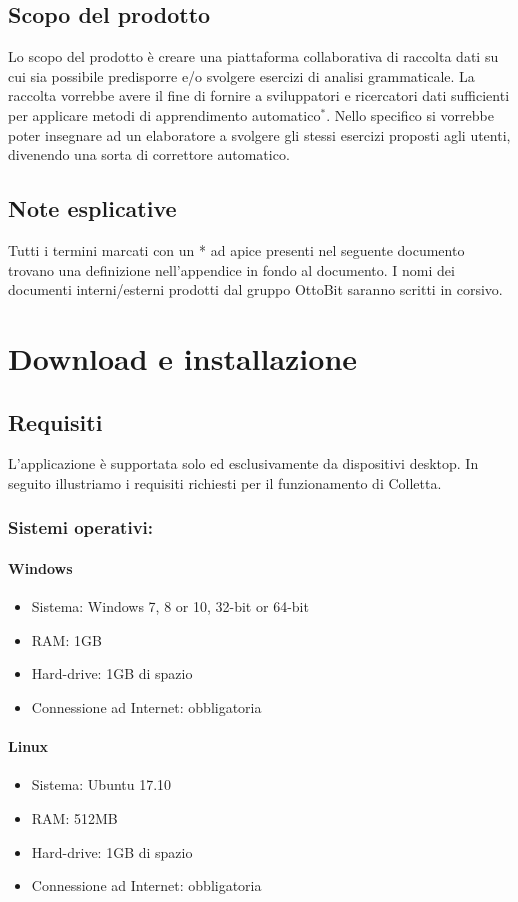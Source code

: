 \documentclass[11pt,a4paper]{article}
\begin{document}
{	\subsection{Scopo del prodotto}
	Lo scopo del prodotto è creare una piattaforma collaborativa di raccolta dati su cui sia possibile predisporre e/o svolgere esercizi di analisi grammaticale. La raccolta vorrebbe avere il fine di fornire a sviluppatori e ricercatori dati sufficienti per applicare metodi di apprendimento automatico$^*$. Nello specifico si vorrebbe poter insegnare ad un elaboratore a svolgere gli stessi esercizi proposti agli utenti, divenendo una sorta di correttore automatico.
	
	\subsection{Note esplicative}
	Tutti i termini marcati con un * ad apice presenti nel seguente documento trovano una definizione
	nell'appendice in fondo al documento.
	I nomi dei documenti interni/esterni prodotti dal gruppo OttoBit saranno scritti in corsivo.
	\newpage
	\section{Download e installazione}
	\subsection{Requisiti}
	L'applicazione è supportata solo ed esclusivamente da dispositivi desktop. In seguito illustriamo i requisiti richiesti per il funzionamento di Colletta.
	\subsubsection{Sistemi operativi:} 
	\paragraph{Windows}
	\begin{itemize}
		\item Sistema: Windows 7, 8 or 10, 32-bit or 64-bit
		\item RAM: 1GB
		\item Hard-drive: 1GB di spazio
		\item Connessione ad Internet: obbligatoria
	\end{itemize}
	\paragraph{Linux}
	\begin{itemize}
		\item Sistema: Ubuntu 17.10
		\item RAM: 512MB
		\item Hard-drive: 1GB di spazio
		\item Connessione ad Internet: obbligatoria
	\end{itemize}
}
\end{document}
